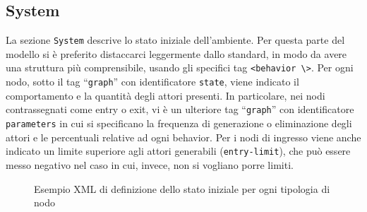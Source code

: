 \subsection{System}

La sezione \texttt{System} descrive lo stato iniziale dell'ambiente. Per questa parte del modello si è preferito distaccarci leggermente dallo standard, in modo da avere una struttura più comprensibile, usando gli specifici tag \texttt{<behavior \textbackslash>}. Per ogni nodo, sotto il tag “\texttt{graph}” con identificatore \texttt{state}, viene indicato il comportamento e la quantità degli attori presenti. In particolare, nei nodi contrassegnati come entry o exit, vi è un ulteriore tag “\texttt{graph}” con identificatore \texttt{parameters} in cui si specificano la frequenza di generazione o eliminazione degli attori e le percentuali relative ad ogni behavior. Per i nodi di ingresso viene anche indicato un limite superiore agli attori generabili (\texttt{entry-limit}), che può essere messo negativo nel caso in cui, invece, non si vogliano porre limiti.

\begin{figure}[htbp]
\centering
\label{fig:xml-system}

\caption{Esempio XML di definizione dello stato iniziale per ogni tipologia di nodo}
\end{figure}

%
%
%
%
%
%


